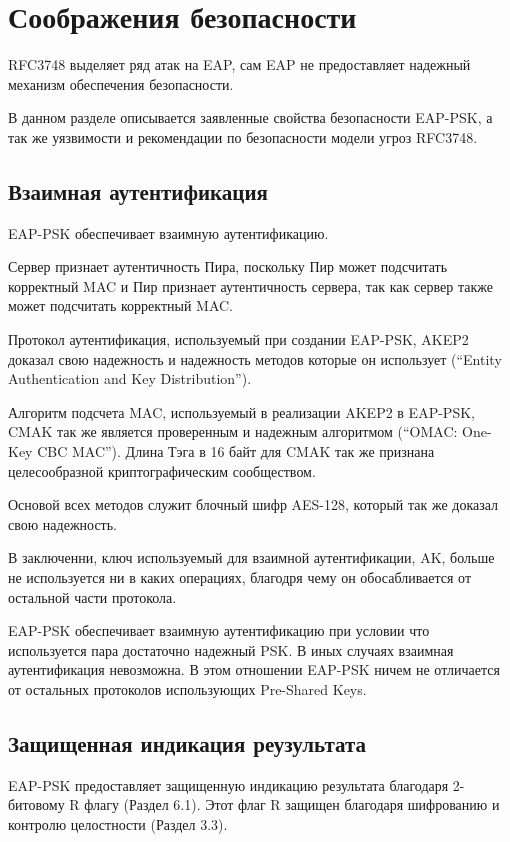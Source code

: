 \newpage
\section{Соображения безопасности}

RFC3748 выделяет ряд атак на EAP, сам EAP не предоставляет надежный механизм обеспечения безопасности.

В данном разделе описывается заявленные свойства безопасности EAP-PSK, а так же уязвимости и рекомендации по безопасности модели угроз RFC3748.

\subsection{Взаимная аутентификация}

EAP-PSK обеспечивает взаимную аутентификацию.

Сервер признает аутентичность Пира, поскольку Пир может подсчитать корректный MAC и Пир признает аутентичность сервера, так как сервер также может подсчитать корректный MAC.

Протокол аутентификация, используемый при создании EAP-PSK, AKEP2 доказал свою надежность и надежность методов которые он использует (``Entity Authentication and Key Distribution'').

Алгоритм подсчета MAC, используемый в реализации AKEP2 в EAP-PSK, CMAK так же является проверенным и надежным алгоритмом (``OMAC: One-Key CBC MAC''). Длина Тэга в 16 байт для CMAK так же признана целесообразной криптографическим сообществом.

Основой всех методов служит блочный шифр AES-128, который так же доказал свою надежность.

В заключенни, ключ используемый для взаимной аутентификации, AK, больше не используется ни в каких операциях, благодря чему он обосабливается от остальной части протокола.

EAP-PSK обеспечивает взаимную аутентификацию при условии что используется пара достаточно надежный PSK. В иных случаях взаимная аутентификация невозможна. В этом отношении EAP-PSK ничем не отличается от остальных протоколов использующих Pre-Shared Keys.

\subsection{Защищенная индикация реузультата}

EAP-PSK предоставляет защищенную индикацию результата благодаря 2-битовому R флагу (Раздел 6.1). Этот флаг R защищен благодаря шифрованию и контролю целостности (Раздел 3.3).

